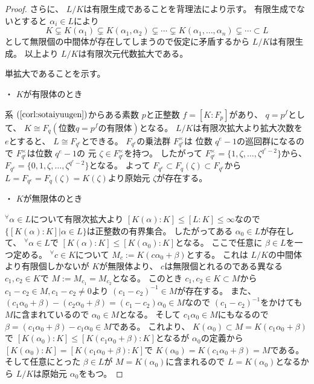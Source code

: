 \documentclass[../master_galois_theory]{subfiles}
\begin{document}
\begin{proof}
  さらに、 $L/K$は有限生成であることを背理法により示す。
  有限生成でないとすると $\alpha_i \in L$により
  \[
  K \subsetneq K(\alpha_1) \subsetneq K(\alpha_1 , \alpha_2) \subsetneq \cdots \subsetneq K(\alpha_1 , \dots , \alpha_n) \subsetneq \cdots \subset L
  \]
  として無限個の中間体が存在してしまうので仮定に矛盾するから
  $L/K$は有限生成。
  以上より $L/K$は有限次元代数拡大である。

  単拡大であることを示す。

  ・ $K$が有限体のとき

  系 $(\mathrm{\ref{corl:sotaiyuugen}})$からある素数 $p$と正整数 $f = [K:F_p]$があり、 $q = p^f$として、
  $K \cong F_q (位数 q = p^f の有限体)$となる。
  $L/K$は有限次拡大より拡大次数を $e$とすると、
  $L \cong F_{q^e}$とできる。
  $F_{q^e}$の乗法群 $F_{q^e}^\times$は
  位数 $q^e - 1$の巡回群になるので $F_{q^e}^\times$は位数 $q^e-1$の
  元 $\zeta \in F_{q^e}^\times$を持つ。
  したがって $F_{q^e}^\times = \{ 1 , \zeta , \dots , \zeta^{q^e-2} \}$から、
  $F_{q^e} = \{ 0 , 1 , \zeta , \dots , \zeta^{q^e-2} \}$となる。
  よって $F_{q^e} \subset F_q(\zeta) \subset F_{q^e}$から
  $L = F_{q^e} = F_q(\zeta) = K(\zeta)$より原始元 $\zeta$が存在する。

  ・ $K$が無限体のとき

  ${}^\forall \alpha \in L$について有限次拡大より
  $[K(\alpha):K] \leq [L:K] \leq \infty$なので
  $\{ [K(\alpha):K] | \alpha \in L \}$は正整数の有界集合。
  したがってある $\alpha_0 \in L$が存在して、
  ${}^\forall \alpha \in L$で $[K(\alpha):K] \leq [K(\alpha_0):K]$となる。
  ここで任意に $\beta \in L$を一つ定める。
  ${}^\forall c \in K$について $M_c := K(c \alpha_0 + \beta)$とする。
  これは $L/K$の中間体より有限個しかないが $K$が無限体より、 $c$は無限個とれるのである異なる $c_1 , c_2 \in K$で
  $M := M_{c_1} = M_{c_2}$となる。
  このとき $c_1 , c_2 \in K \subset M$から $c_1 - c_2 \in M , c_1 - c_2 \neq 0$より $(c_1 - c_2)^{-1} \in M$が存在する。
  また、 $(c_1 \alpha_0 + \beta) - (c_2 \alpha_0 + \beta) = (c_1 - c_2) \alpha_0 \in M$なので $(c_1 - c_2)^{-1}$をかけても $M$に含まれているので
  $\alpha_0 \in M$となる。
  そして $c_1 \alpha_0 \in M$にもなるので
  $\beta = (c_1 \alpha_0 + \beta) - c_1 \alpha_0 \in M$である。
  これより、 $K(\alpha_0) \subset M = K(c_1 \alpha_0 + \beta)$で
  $[K(\alpha_0):K] \leq [K(c_1 \alpha_0 + \beta):K]$となるが
  $\alpha_0$の定義から $[K(\alpha_0):K] = [K(c_1 \alpha_0 + \beta):K]$で
  $K(\alpha_0) = K(c_1 \alpha_0 + \beta) = M$である。
  そして任意にとった $\beta \in L$が $M = K(\alpha_0)$に含まれるので
  $L = K(\alpha_0)$となるから $L/K$は原始元 $\alpha_0$をもつ。
\end{proof}
\end{document}
